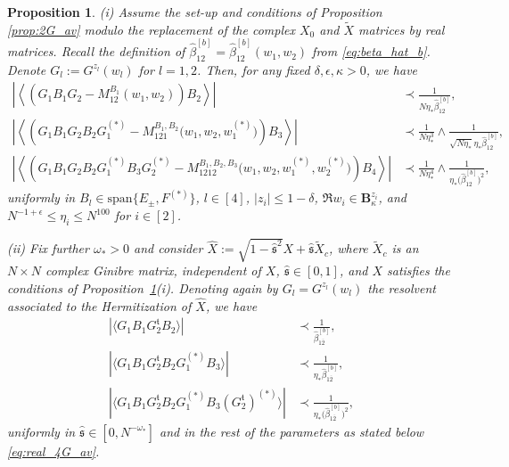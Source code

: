 \documentclass[10pt]{amsart}
\newtheorem{proposition}[theorem]{Proposition}
\numberwithin{equation}{section}
\newcommand{\mt}{\mathfrak{t}}
\begin{document}
\begin{proposition}\label{prop:real_2G_av} (i) Assume the set-up and conditions of Proposition \ref{prop:2G_av} modulo the replacement of the complex $X_0$ and $\widetilde{X}$ matrices by real matrices. Recall the definition of $\widehat{\beta}_{12}^{[b]}=\widehat{\beta}^{[b]}_{12}(w_1,w_2)$ from \eqref{eq:beta_hat_b}. Denote $G_l:=G^{z_l}(w_l)$ for $l=1,2$. Then, for any fixed $\delta,\epsilon,\kappa>0$, we have
\begin{align}
\left\vert \left\langle \left(G_1B_1G_2-M_{12}^{B_1}(w_1,w_2)\right)B_2\right\rangle\right\vert &\prec \frac{1}{N\eta_*\widehat{\beta}_{12}^{[b]}},\label{eq:real_2G_av}\\
\left\vert\left\langle \left(G_1B_1G_2B_2G_1^{(*)}-M_{121}^{B_1,B_2}\big(w_1,w_2,w_1^{(*)}\big)\right) B_3\right\rangle\right\vert &\prec \frac{1}{N\eta_*^3}\wedge\frac{1}{\sqrt{N\eta_*}\eta_*\widehat{\beta}_{12}^{[b]}},\label{eq:real_3G_av}\\
\left\vert\left\langle \left(G_1B_1G_2B_2G_1^{(*)}B_3G_2^{(*)}-M_{1212}^{B_1,B_2,B_3}\big(w_1,w_2,w_1^{(*)}, w_2^{(*)}\big)\right) B_4\right\rangle\right\vert &\prec \frac{1}{N\eta_*^4}\wedge\frac{1}{\eta_*\big(\widehat{\beta}_{12}^{[b]}\big)^2},\label{eq:real_4G_av}
\end{align}  
uniformly in $B_l\in\mathrm{span}\{E_\pm,F^{(*)}\}$, $l\in[4]$, $|z_i|\le 1-\delta$, $\Re w_i\in\mathbf{B}_\kappa^{z_i}$, and $N^{-1+\epsilon}\le \eta_i\le N^{100}$ for $i\in[2]$.

(ii) Fix further $\omega_*>0$ and consider $\widehat{X}:=\sqrt{1-\widehat{\mathfrak{s}}^2}X + \widehat{\mathfrak{s}}\widetilde{X}_c$, where $\widetilde{X}_c$ is an $N\times N$ complex Ginibre matrix, independent of $X$, $\widehat{\mathfrak{s}}\in [0,1]$, and $X$ satisfies the conditions of Proposition~\ref{prop:real_2G_av}(i). Denoting again by $G_l=G^{z_l}(w_l)$ the resolvent associated to the Hermitization of $\widehat{X}$, we have 
\begin{align}
\left\vert\langle G_1B_1G_2^\mt B_2\rangle\right\vert &\prec \frac{1}{\widehat{\beta}^{[b]}_{1\overline{2}}},\label{eq:2G_bound_cr}\\
\left\vert \langle G_1B_1G_2^\mt B_2G_1^{(*)}B_3\rangle\right\vert&\prec \frac{1}{\eta_*\widehat{\beta}^{[b]}_{1\overline{2}}},\label{eq:3G_bound_cr}\\
\left\vert \langle G_1B_1G_2^\mt B_2G_1^{(*)}B_3(G_2^\mt)^{(*)}\rangle\right\vert&\prec \frac{1}{\eta_*\big(\widehat{\beta}^{[b]}_{1\overline{2}}\big)^2},\label{eq:4G_bound_cr}
\end{align}
uniformly in $\widehat{\mathfrak{s}}\in [0,N^{-\omega_*}]$ and in the rest of the parameters as stated below \eqref{eq:real_4G_av}.
\end{proposition}
\end{document}

